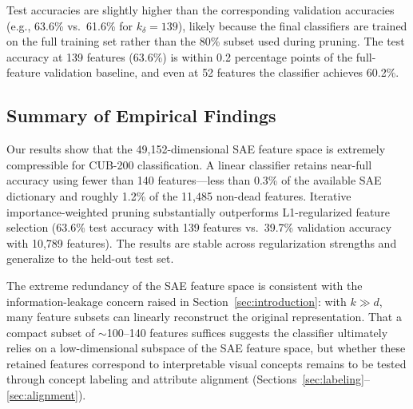 Test accuracies are slightly higher than the corresponding validation accuracies (e.g., 63.6\% vs.\ 61.6\% for $k_\delta = 139$), likely because the final classifiers are trained on the full training set rather than the 80\% subset used during pruning. The test accuracy at 139 features (63.6\%) is within 0.2 percentage points of the full-feature validation baseline, and even at 52 features the classifier achieves 60.2\%.

\subsection{Summary of Empirical Findings}

Our results show that the 49{,}152-dimensional SAE feature space is extremely compressible for CUB-200 classification. A linear classifier retains near-full accuracy using fewer than 140 features---less than 0.3\% of the available SAE dictionary and roughly 1.2\% of the 11{,}485 non-dead features. Iterative importance-weighted pruning substantially outperforms L1-regularized feature selection (63.6\% test accuracy with 139 features vs.\ 39.7\% validation accuracy with 10{,}789 features). The results are stable across regularization strengths and generalize to the held-out test set.

The extreme redundancy of the SAE feature space is consistent with the information-leakage concern raised in Section~\ref{sec:introduction}: with $k \gg d$, many feature subsets can linearly reconstruct the original representation. That a compact subset of $\sim$100--140 features suffices suggests the classifier ultimately relies on a low-dimensional subspace of the SAE feature space, but whether these retained features correspond to interpretable visual concepts remains to be tested through concept labeling and attribute alignment (Sections~\ref{sec:labeling}--\ref{sec:alignment}).
